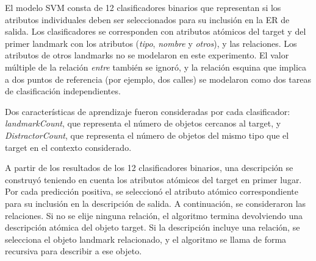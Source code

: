 



El modelo SVM consta de 12 clasificadores binarios que representan si los atributos individuales deben ser seleccionados para su inclusi\'on en la ER de salida. Los clasificadores se corresponden con atributos at\'omicos del target y del primer landmark con los atributos ({\em tipo}, {\em nombre } y {\em otros}), y las relaciones. Los atributos de otros landmarks no se modelaron en este experimento. El valor m\'ultiple de la relaci\'on {\em entre} tambi\'en se ignor\'o, y la relaci\'on esquina que implica a dos puntos de referencia (por ejemplo, dos calles) se modelaron como dos tareas de clasificaci\'on independientes.

Dos caracter\'{i}sticas de aprendizaje fueron consideradas por cada clasificador: {\em landmarkCount}, que representa el n\'umero de objetos cercanos al target, y {\em DistractorCount}, que representa el n\'umero de objetos del mismo tipo que el target en el contexto considerado.

A partir de los resultados de los 12 clasificadores binarios, una descripci\'on se construy\'o teniendo en cuenta los atributos at\'omicos del target en primer lugar. Por cada predicci\'on positiva, se seleccion\'o el atributo at\'omico correspondiente para su inclusi\'on en la descripci\'on de salida. A continuaci\'on, se consideraron las relaciones. Si no se elije ninguna relaci\'on, el algoritmo termina devolviendo una descripci\'on at\'omica del objeto target. Si la descripci\'on incluye una relaci\'on, se selecciona el objeto landmark relacionado, y el algoritmo se llama de forma recursiva para describir a ese objeto.

